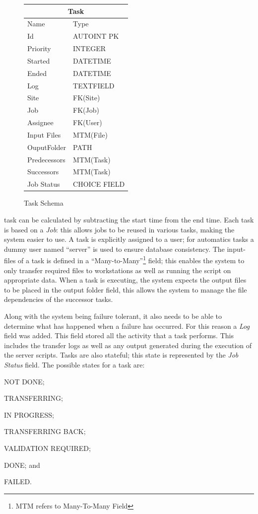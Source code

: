 \documentclass[12pt,a4paper]{report}
\begin{document}
\begin{figure}
\begin{tabular}{l|l}
    \multicolumn{2}{c}{Task} \\
    \hline
    Name        & Type \\
    \hline
    Id              & AUTOINT PK  \\
    Priority        & INTEGER  \\
    Started         & DATETIME \\
    Ended           & DATETIME \\
    Log             & TEXTFIELD \\
    Site            & FK(Site) \\
    Job             & FK(Job) \\
    Assignee        & FK(User) \\
    Input Files     & MTM(File) \\
    OuputFolder     & PATH \\
    Predecessors    & MTM(Task) \\
    Successors      & MTM(Task) \\
    Job Status      & CHOICE FIELD \\
\end{tabular}
\caption{Task Schema}
\end{figure}
\noindent task can be calculated by subtracting the start time from the end time. Each
task is based on a \emph{Job}: this allows jobs to be reused in various tasks, making the
system easier to use. A task is explicitly assigned to a user; for automatics tasks a
dummy user named ``server'' is used to ensure database consistency. The input-files of
a task is defined in a ``Many-to-Many''\footnote{MTM refers to Many-To-Many Field}
field; this enables the system to only transfer
required files to workstations as well as running the script on appropriate data. When
a task is executing, the system expects the output files to be placed in the output folder
field, this allows the system to manage the file dependencies of the successor tasks.

Along with the system being failure tolerant, it also needs to be able to determine what
has happened when a failure has occurred. For this reason a \emph{Log} field was
added. This field stored all the activity that a task performs. This includes the transfer logs as
well as any output generated during the execution of the server scripts. Tasks are also
stateful; this state is represented by the \emph{Job Status} field. The possible states
for a task are:
\begin{inparaenum}[(i)]
\item NOT DONE;
\item TRANSFERRING;
\item IN PROGRESS;
\item TRANSFERRING BACK;
\item VALIDATION REQUIRED;
\item DONE; and
\item FAILED.
\end{inparaenum}
\end{document}
